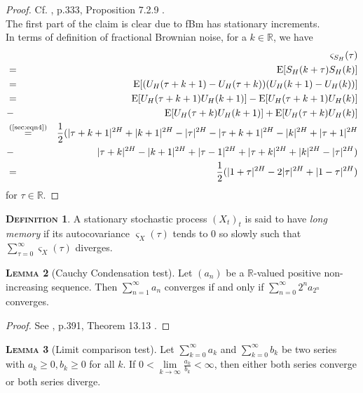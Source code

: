 \documentclass[a4paper, twoside, 11pt]{article}
\theoremstyle{definition}
\newtheorem{definition}{\scshape Definition}[section]
\newtheorem{lemma}[definition]{\scshape Lemma}
\begin{document}
  \begin{proof}
	Cf. \cite{nourdin}, p.333, Proposition 7.2.9 .\\
	The first part of the claim is clear due to fBm has stationary increments.\\
	In terms of definition of fractional Brownian noise, for a $k \in \mathbb{R}$, we have
	\begin{eqnarray*}
	  &&\varsigma_{S_H}(\tau)\\
	  &=& \mathrm{E}[S_H(k+\tau)S_H(k)] \\
	  &=& \mathrm{E}[(U_H(\tau+k+1) - U_H(\tau+k))(U_H(k+1)-U_H(k))]\\
	  &=& \mathrm{E}[U_H(\tau+k+1)U_H(k+1)] - \mathrm{E}[U_H(\tau+k+1)U_H(k)] \\
	  &-& \mathrm{E}[U_H(\tau+k)U_H(k+1)] + \mathrm{E}[U_H(\tau+k)U_H(k)]\\
	  &\overset{\text{(\ref{sec:eqn4})}}{=}& \frac{1}{2} ( |\tau+k+1|^{2H} + |k+1|^{2H} - |\tau|^{2H} - |\tau+k+1|^{2H} - |k|^{2H} + |\tau+1|^{2H}\\
	  &-& |\tau+k|^{2H} - |k+1|^{2H} + |\tau-1|^{2H} + |\tau+k|^{2H} + |k|^{2H} - |\tau|^{2H})\\
	  &=& \frac{1}{2}(|1+\tau|^{2H} - 2|\tau|^{2H} + |1-\tau|^{2H})
	\end{eqnarray*}
	for $\tau \in \mathbb{R}$.
  \end{proof}

  \begin{definition}
	A stationary stochastic process $(X_t)_t$ is said to have \emph{long memory} if its autocovariance $\varsigma_X(\tau)$ tends to $0$ so slowly such that
	$ \sum_{\tau = 0} ^{\infty} \varsigma_X(\tau)$ diverges.
  \end{definition}

  \begin{lemma}[Cauchy Condensation test]
	Let $(a_n)$ be a $\mathbb{R}$-valued positive non-increasing sequence. Then $\sum_{n=1}^{\infty} a_n$ converges if and only if $\sum_{n=0}^{\infty} 2^n a_{2^n}$ converges.
	\label{sec:cauchy}
  \end{lemma}
  \begin{proof}
	See \cite{michael}, p.391, Theorem 13.13 .
  \end{proof}

  \begin{lemma}[Limit comparison test]
	Let $\sum_{k=0}^{\infty} a_k$ and $\sum_{k=0}^{\infty} b_k$ be two series with $a_k \ge 0, b_k \ge 0$ for all $k$. If $0 <\lim\limits_{k\rightarrow \infty}\frac{a_k}{b_k} < \infty$, then either both series converge or both series diverge.
  \end{lemma}
\end{document}
